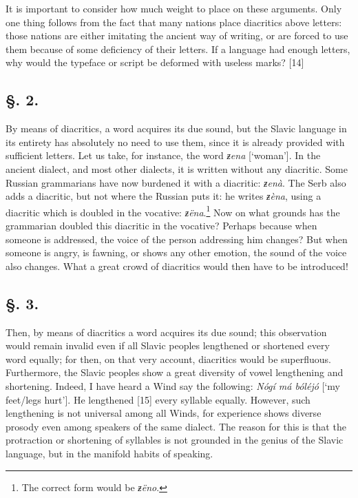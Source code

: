 It is important to consider how much weight to place on these arguments. Only one thing follows from the fact that many nations place diacritics above letters: those nations are either imitating the ancient way of writing, or are forced to use them because of some deficiency of their letters. If a language had enough letters, why would the typeface or script be deformed with useless marks? [14]

\subsection*{\hspace*{\fill}§. 2.\hspace*{\fill}}

By means of diacritics, a word acquires its due sound, but the Slavic language in its entirety has absolutely no need to use them, since it is already provided with sufficient letters. Let us take, for instance, the word \textit{ƶena} [‘woman’]. In the ancient dialect, and most other dialects, it is written without any diacritic. Some Russian grammarians have now burdened it with a diacritic: \textit{ƶenà}. The Serb also adds a diacritic, but not where the Russian puts it: he writes \textit{ƶèna}, using a diacritic which is doubled in the vocative: \textit{ƶëna}.\footnote{The correct form would be \textit{ƶëno}.} Now on what grounds has the grammarian doubled this diacritic in the vocative? Perhaps because when someone is addressed, the voice of the person addressing him changes? But when someone is angry, is fawning, or shows any other emotion, the sound of the voice also changes. What a great crowd of diacritics would then have to be introduced!

\subsection*{\hspace*{\fill}§. 3.\hspace*{\fill}}

Then, by means of diacritics a word acquires its due sound; this observation would remain invalid even if all Slavic peoples lengthened or shortened every word equally; for then, on that very account, diacritics would be superfluous. Furthermore, the Slavic peoples show a great diversity of vowel lengthening and shortening. Indeed, I have heard a Wind say the following: \textit{Nógí má bóléjó} [‘my feet/legs hurt’]. He lengthened [15] every syllable equally. However, such lengthening is not universal among all Winds, for experience shows diverse prosody even among speakers of the same dialect. The reason for this is that the protraction or shortening of syllables is not grounded in the genius of the Slavic language, but in the manifold habits of speaking.

